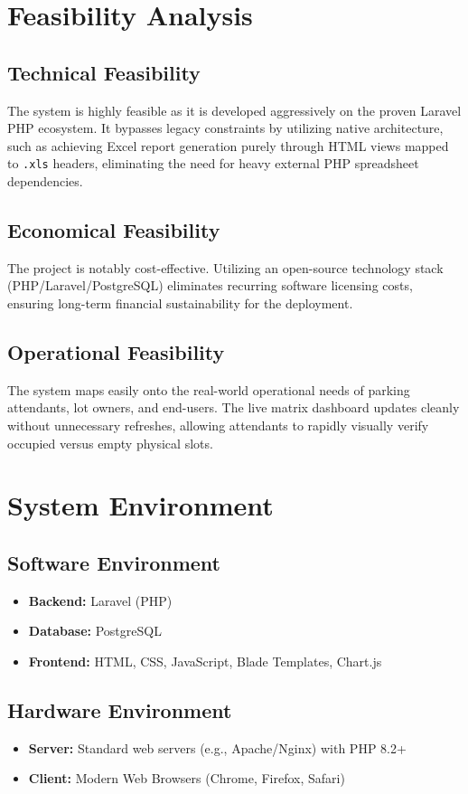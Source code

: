\documentclass[12pt,a4paper]{report}
\begin{document}
\section{Feasibility Analysis}
\subsection{Technical Feasibility}
The system is highly feasible as it is developed aggressively on the proven Laravel PHP ecosystem. It bypasses legacy constraints by utilizing native architecture, such as achieving Excel report generation purely through HTML views mapped to \texttt{.xls} headers, eliminating the need for heavy external PHP spreadsheet dependencies.

\subsection{Economical Feasibility}
The project is notably cost-effective. Utilizing an open-source technology stack (PHP/Laravel/PostgreSQL) eliminates recurring software licensing costs, ensuring long-term financial sustainability for the deployment.

\subsection{Operational Feasibility}
The system maps easily onto the real-world operational needs of parking attendants, lot owners, and end-users. The live matrix dashboard updates cleanly without unnecessary refreshes, allowing attendants to rapidly visually verify occupied versus empty physical slots.

\section{System Environment}
\subsection{Software Environment}
\begin{itemize}
    \item \textbf{Backend:} Laravel (PHP)
    \item \textbf{Database:} PostgreSQL
    \item \textbf{Frontend:} HTML, CSS, JavaScript, Blade Templates, Chart.js
\end{itemize}

\subsection{Hardware Environment}
\begin{itemize}
    \item \textbf{Server:} Standard web servers (e.g., Apache/Nginx) with PHP 8.2+
    \item \textbf{Client:} Modern Web Browsers (Chrome, Firefox, Safari)
\end{itemize}
\end{document}
